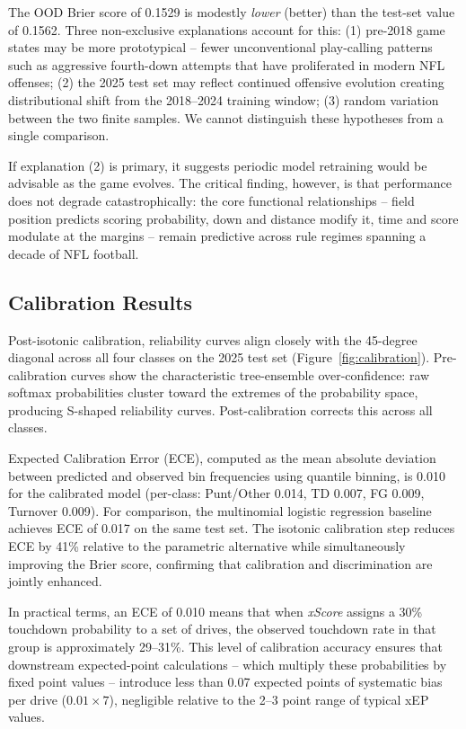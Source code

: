 \documentclass[12pt,a4paper]{article}
\newcommand{\xscore}{\textit{xScore}}
\begin{document}
The OOD Brier score of 0.1529 is modestly \emph{lower} (better) than the test-set value of 0.1562. Three non-exclusive explanations account for this: (1) pre-2018 game states may be more prototypical -- fewer unconventional play-calling patterns such as aggressive fourth-down attempts that have proliferated in modern NFL offenses; (2) the 2025 test set may reflect continued offensive evolution creating distributional shift from the 2018--2024 training window; (3) random variation between the two finite samples. We cannot distinguish these hypotheses from a single comparison.

If explanation (2) is primary, it suggests periodic model retraining would be advisable as the game evolves. The critical finding, however, is that performance does not degrade catastrophically: the core functional relationships -- field position predicts scoring probability, down and distance modify it, time and score modulate at the margins -- remain predictive across rule regimes spanning a decade of NFL football.

\subsection{Calibration Results}

Post-isotonic calibration, reliability curves align closely with the 45-degree diagonal across all four classes on the 2025 test set (Figure~\ref{fig:calibration}). Pre-calibration curves show the characteristic tree-ensemble over-confidence: raw softmax probabilities cluster toward the extremes of the probability space, producing S-shaped reliability curves. Post-calibration corrects this across all classes.

Expected Calibration Error (ECE), computed as the mean absolute deviation between predicted and observed bin frequencies using quantile binning, is 0.010 for the calibrated model (per-class: Punt/Other 0.014, TD 0.007, FG 0.009, Turnover 0.009). For comparison, the multinomial logistic regression baseline achieves ECE of 0.017 on the same test set. The isotonic calibration step reduces ECE by 41\% relative to the parametric alternative while simultaneously improving the Brier score, confirming that calibration and discrimination are jointly enhanced.

In practical terms, an ECE of 0.010 means that when \xscore{} assigns a 30\% touchdown probability to a set of drives, the observed touchdown rate in that group is approximately 29--31\%. This level of calibration accuracy ensures that downstream expected-point calculations -- which multiply these probabilities by fixed point values -- introduce less than 0.07 expected points of systematic bias per drive ($0.01 \times 7$), negligible relative to the 2--3 point range of typical xEP values.
\end{document}
